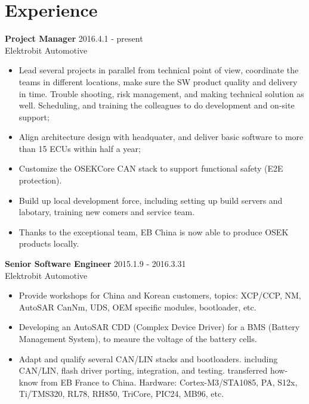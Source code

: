 
\section{Experience}
\textbf{Project Manager} \hfill 2016.4.1 - present \\
        Elektrobit Automotive
        \begin{itemize}  \itemsep -2pt %
        \item Lead several projects in parallel from technical point of view,
            coordinate the teams in different locations,
            make sure the SW product quality and delivery in time.
            Trouble shooting, risk management, and making technical solution as well.
            Scheduling, and training the colleagues to do development and on-site support;
        \item Align architecture design with headquater,
              and deliver basic software to more than 15 ECUs within half a year;
        \item Customize the OSEKCore CAN stack to support functional safety (E2E protection).
        \item Build up local development force,
        including setting up build servers and labotary,
        training new comers and service team.
        \item Thanks to the exceptional team,
            EB China is now able to produce OSEK products locally.
        \end{itemize}

\textbf{Senior Software Engineer} \hfill 2015.1.9 - 2016.3.31 \\
        Elektrobit Automotive
        \begin{itemize}  \itemsep -2pt %
        \item Provide workshops for China and Korean customers,
            topics:
            XCP/CCP, NM, AutoSAR CanNm, UDS, OEM specific modules, bootloader, etc.
        \item Developing an AutoSAR CDD (Complex Device Driver) for a BMS (Battery Management System),
            to meaure the voltage of the battery cells.
        \item Adapt and qualify several CAN/LIN stacks and bootloaders.
            including CAN/LIN, flash driver porting, integration, and testing.
            transferred how-know from EB France to China.
            Hardware: Cortex-M3/STA1085, PA, S12x, Ti/TMS320, RL78, RH850, TriCore, PIC24, MB96, etc.
        \end{itemize}

